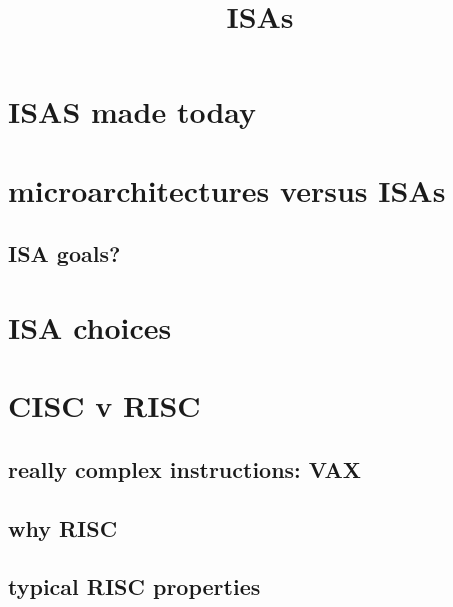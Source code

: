 \graphicspath{{./figures/}}
\title{ISAs}
\date{}
\usepackage{xspace}
\usepackage{cancel}
\usepackage{adjustbox}

\begin{frame}
    \titlepage
\end{frame}

\usetikzlibrary{circuits.logic.US}


\section{ISAS made today}


\section{microarchitectures versus ISAs}




\subsection{ISA goals?}


\section{ISA choices}


\section{CISC v RISC}



\subsection{really complex instructions: VAX}



\subsection{why RISC}



\subsection{typical RISC properties}

